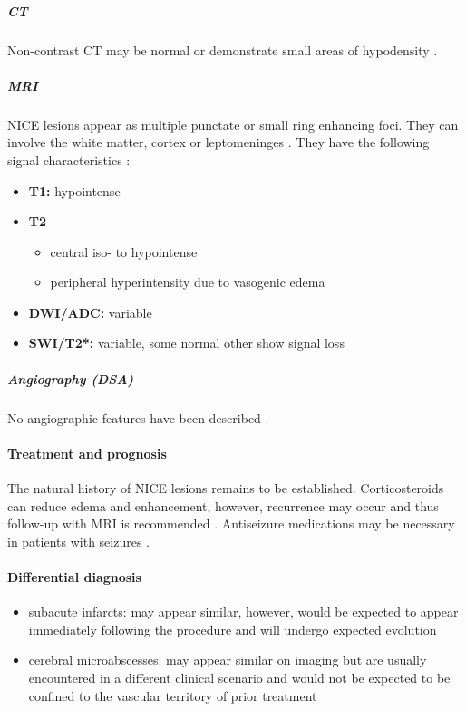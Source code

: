 \subparagraph{CT}

Non-contrast CT may be normal or demonstrate small areas of hypodensity .

\subparagraph{MRI}

NICE lesions appear as multiple punctate or small ring enhancing foci. They can involve the white matter, cortex or leptomeninges . They have the following signal characteristics :

\begin{itemize}
	\item
	\textbf{T1:} hypointense
	\item
	\textbf{T2}
	
	\begin{itemize}
		\item
		central iso- to hypointense
		\item
		peripheral hyperintensity due to vasogenic edema
	\end{itemize}
	\item
	\textbf{DWI/ADC:} variable
	\item
	\textbf{SWI/T2*:} variable, some normal other show signal loss
\end{itemize}

\subparagraph{Angiography (DSA)}

No angiographic features have been described .

\paragraph{Treatment and prognosis}

The natural history of NICE lesions remains to be established. Corticosteroids can reduce edema and enhancement, however, recurrence may occur and thus follow-up with MRI is recommended . Antiseizure medications may be necessary in patients with seizures .

\paragraph{Differential diagnosis}

\begin{itemize}
	\item
	subacute infarcts: may appear similar, however, would be expected to appear immediately following the procedure and will undergo expected evolution
	\item
	cerebral microabscesses: may appear similar on imaging but are usually encountered in a different clinical scenario and would not be expected to be confined to the vascular territory of prior treatment
\end{itemize}